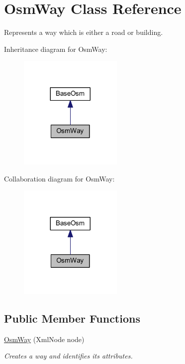 \hypertarget{class_osm_way}{}\section{Osm\+Way Class Reference}
\label{class_osm_way}


Represents a way which is either a road or building.  




Inheritance diagram for Osm\+Way\+:\nopagebreak
\begin{figure}[H]
\begin{center}
\leavevmode
\includegraphics[width=140pt]{class_osm_way__inherit__graph}
\end{center}
\end{figure}


Collaboration diagram for Osm\+Way\+:\nopagebreak
\begin{figure}[H]
\begin{center}
\leavevmode
\includegraphics[width=140pt]{class_osm_way__coll__graph}
\end{center}
\end{figure}
\subsection*{Public Member Functions}
\begin{DoxyCompactItemize}
\item 
\mbox{\hyperlink{class_osm_way_a4b486f3c7606411894045f470aa882c6}{Osm\+Way}} (Xml\+Node node)
\begin{DoxyCompactList}\small\item\em Creates a way and identifies its attributes. \end{DoxyCompactList}\end{DoxyCompactItemize}
